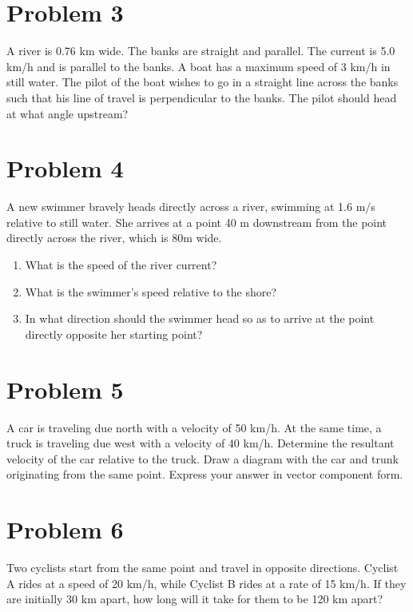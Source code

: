 \documentclass[tikz,border=10pt]{article}
\begin{document}
\section*{Problem 3}
A river is 0.76 km wide. The banks are straight and parallel. The current is 5.0 km/h and is parallel to the banks. A boat has a maximum speed of 3 km/h in still water. The pilot of the boat wishes to go in a straight line across the banks such that his line of travel is perpendicular to the banks. The pilot should head at what angle upstream?

\section*{Problem 4}
A new swimmer bravely heads directly across a river, swimming at 1.6 m/s relative to still water. She arrives at a point 40 m downstream from the point directly across the river, which is 80m wide. 
\begin{enumerate}
    \item What is the speed of the river current?
    \item What is the swimmer's speed relative to the shore?
    \item In what direction should the swimmer head so as to arrive at the point directly opposite her starting point?
\end{enumerate}

\section*{Problem 5}
A car is traveling due north with a velocity of 50 km/h. At the same time, a truck is traveling due west with a velocity of 40 km/h. Determine the resultant velocity of the car relative to the truck. Draw a diagram with the car and trunk originating from the same point. Express your answer in vector component form.

\section*{Problem 6}
Two cyclists start from the same point and travel in opposite directions. Cyclist A rides at a speed of 20 km/h, while Cyclist B rides at a rate of 15 km/h. If they are initially 30 km apart, how long will it take for them to be 120 km apart?
\end{document}
